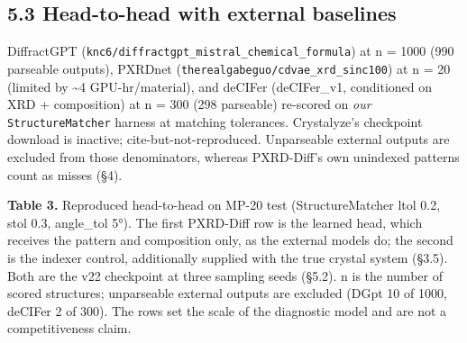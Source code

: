 \documentclass[
  11pt,
]{article}
\begin{document}
\subsection{5.3 Head-to-head with external
baselines}\label{head-to-head-with-external-baselines}

DiffractGPT (\texttt{knc6/diffractgpt\_mistral\_chemical\_formula}) at n
= 1000 (990 parseable outputs), PXRDnet
(\texttt{therealgabeguo/cdvae\_xrd\_sinc100}) at n = 20 (limited by
\textasciitilde4 GPU-hr/material), and deCIFer (deCIFer\_v1, conditioned
on XRD + composition) at n = 300 (298 parseable) re-scored on \emph{our}
\texttt{StructureMatcher} harness at matching tolerances. Crystalyze's
checkpoint download is inactive; cite-but-not-reproduced. Unparseable
external outputs are excluded from those denominators, whereas
PXRD-Diff's own unindexed patterns count as misses (§4).

\textbf{Table 3.} Reproduced head-to-head on MP-20 test
(StructureMatcher ltol 0.2, stol 0.3, angle\_tol 5°). The first
PXRD-Diff row is the learned head, which receives the pattern and
composition only, as the external models do; the second is the indexer
control, additionally supplied with the true crystal system (§3.5). Both
are the v22 checkpoint at three sampling seeds (§5.2). n is the number
of scored structures; unparseable external outputs are excluded (DGpt 10
of 1000, deCIFer 2 of 300). The rows set the scale of the diagnostic
model and are not a competitiveness claim.
\end{document}
